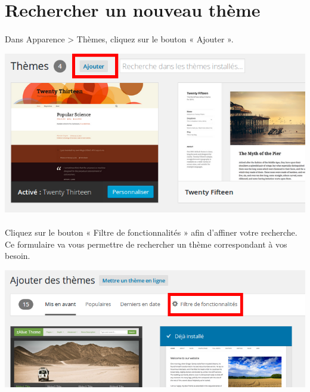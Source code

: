 \documentclass[10pt,a4paper]{article}
\begin{document}
\section{Rechercher un nouveau thème}
\paragraph{}Dans Apparence > Thèmes, cliquez sur le bouton « Ajouter ».
\begin{center}
\includegraphics[scale=0.3]{img/0239.png}
\end{center}
\paragraph{}Cliquez sur le bouton « Filtre de fonctionnalités » afin d'affiner votre recherche. Ce formulaire va vous permettre de rechercher un thème correspondant à vos besoin.
\begin{center}
\includegraphics[scale=0.3]{img/0240.png}
\end{center}
\end{document}
